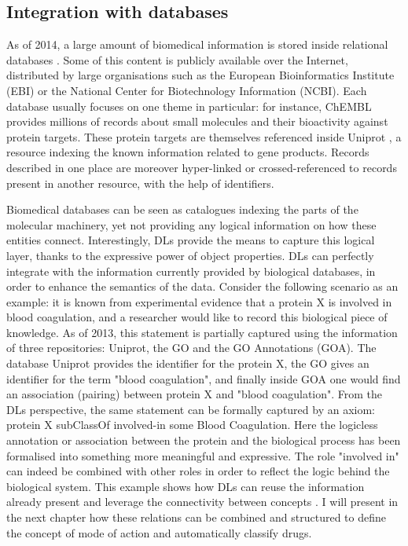 \subsection{Integration with databases}

As of 2014, a large amount of biomedical information is stored inside relational databases \citep{brooksbank2014european}. Some of this content is publicly available over the Internet, distributed by large organisations such as the European Bioinformatics Institute (EBI) or the National Center for Biotechnology Information (NCBI). Each database usually focuses on one theme in particular: for instance, ChEMBL \citep{gaulton2012chembl} provides millions of records about small molecules and their bioactivity against protein targets. These protein targets are themselves referenced inside Uniprot \citep{uniprot2013update}, a resource indexing the known information related to gene products. Records described in one place are moreover hyper-linked or crossed-referenced to records present in another resource, with the help of identifiers.

Biomedical databases can be seen as catalogues indexing the parts of the molecular machinery, yet not providing any logical information on how these entities connect. Interestingly, DLs provide the means to capture this logical layer, thanks to the expressive power of object properties. DLs can perfectly integrate with the information currently provided by biological databases, in order to enhance the semantics of the data. Consider the following scenario as an example: it is known from experimental evidence that a protein X is involved in blood coagulation, and a researcher would like to record this biological piece of knowledge. As of 2013, this statement is partially captured using the information of three repositories: Uniprot, the GO and the GO Annotations (GOA). The database Uniprot provides the identifier for the protein X, the GO gives an identifier for the term "blood coagulation", and finally inside GOA one would find an association (pairing) between protein X and "blood coagulation". From the DLs perspective, the same statement can be formally captured by an axiom: protein X subClassOf involved-in some Blood Coagulation. Here the logicless annotation or association between the protein and the biological process has been formalised into something more meaningful and expressive. The role "involved in" can indeed be combined with other roles in order to reflect the logic behind the biological system. This example shows how DLs can reuse the information already present and leverage the connectivity between concepts \citep{jupp2012logical}. I will present in the next chapter how these relations can be combined and structured to define the concept of mode of action and automatically classify drugs.


